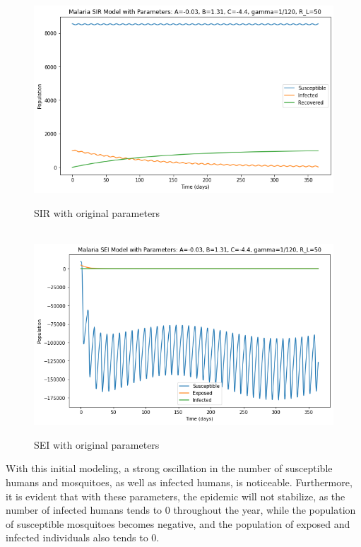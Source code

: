 \begin{figure}[!ht]
        \centering
        \hbox{\hspace{5em} \includegraphics[scale=0.5] {THESIS-SIR_Dados_Originais_Parham_Michael.png}}
        \caption{SIR with original parameters}
\end{figure} 
\begin{figure}[!ht]
        \centering
        \hbox{\hspace{4.5em} \includegraphics[scale=0.5] {THESIS-SEI_Dados_Originais_Parham_Michael.png}}
        \caption{SEI with original parameters}
\end{figure} 
\newpage
With this initial modeling, 
a strong oscillation in the number 
of susceptible humans and mosquitoes, 
as well as infected humans, is noticeable. 
Furthermore, it is evident that with these 
parameters, the epidemic will not stabilize, 
as the number of infected humans tends to 0 
throughout the year, while the population of 
susceptible mosquitoes becomes negative, and the 
population of exposed and infected individuals also tends to 0. 
